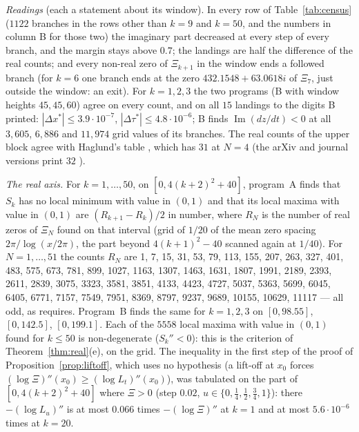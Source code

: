 \documentclass[11pt]{article}
\theoremstyle{plain}
\theoremstyle{definition}
\theoremstyle{remark}
\newcommand{\im}{\operatorname{Im}}
\begin{document}
\emph{Readings} (each a statement about its window). In every row of
Table~\ref{tab:census} ($1122$ branches in the rows other than $k = 9$ and
$k = 50$, and the numbers in column B for those two) the imaginary part decreased at every step of every branch,
and the margin stays above $0.7$; the landings are half the difference
of the real counts; and every non-real zero of $\Xi_{k+1}$ in the window ends a
followed branch (for $k = 6$ one branch ends at the zero $432.1548 + 63.0618i$
of $\Xi_7$, just outside the window: an exit). For $k = 1, 2, 3$ the two programs (B with window heights $45, 45, 60$)
agree on every count, and on all $15$ landings to the digits B printed:
$|\Delta x^*| \le 3.9\cdot10^{-7}$, $|\Delta\tau^*| \le 4.8\cdot10^{-6}$;
B finds $\im(dz/dt) < 0$ at all $3{,}605$, $6{,}886$ and $11{,}974$ grid values
of its branches. The real counts of the upper block agree with Haglund's table
\cite[p.~4]{HagW}, which has $31$ at $N = 4$ (the arXiv and journal versions
print $32$ \cite[p.~4]{Hag}).

\emph{The real axis.} For $k = 1, \ldots, 50$, on $[0, 4(k+2)^2 + 40]$, program~A
finds that $S_k$ has no local minimum with value in $(0,1)$ and that its local
maxima with value in $(0,1)$ are $(R_{k+1} - R_k)/2$ in number, where $R_N$ is
the number of real zeros of $\Xi_N$ found on that interval (grid of $1/20$ of
the mean zero spacing $2\pi/\log(x/2\pi)$, the part beyond $4(k+1)^2 - 40$
scanned again at $1/40$). For $N = 1, \ldots, 51$ the counts $R_N$ are
1, 7, 15, 31, 53, 79, 113, 155, 207, 263, 327, 401, 483, 575, 673, 781, 899,
1027, 1163, 1307, 1463, 1631, 1807, 1991, 2189, 2393, 2611, 2839, 3075, 3323,
3581, 3851, 4133, 4423, 4727, 5037, 5363, 5699, 6045, 6405, 6771, 7157, 7549,
7951, 8369, 8797, 9237, 9689, 10155, 10629, 11117 --- all odd, as
\cite[Corollary~3.5]{Tya} requires. Program~B finds the same for $k = 1, 2, 3$
on $[0, 98.55]$, $[0, 142.5]$, $[0, 199.1]$. Each of the $5558$ local maxima
with value in $(0,1)$ found for $k \le 50$ is non-degenerate ($S_k'' < 0$):
this is the criterion of Theorem~\ref{thm:real}(e), on the grid. The inequality in the first step of the proof of
Proposition~\ref{prop:liftoff}, which uses no hypothesis (a lift-off at $x_0$
forces $(\log\Xi)''(x_0) \ge (\log L_t)''(x_0)$), was tabulated on the part of
$[0, 4(k+2)^2 + 40]$ where $\Xi > 0$ (step $0.02$, $u \in \{0, \frac14,
\frac12, \frac34, 1\}$): there $-(\log L_u)''$ is at most $0.066$ times
$-(\log\Xi)''$ at $k = 1$ and at most $5.6\cdot10^{-6}$ times at $k = 20$.
\end{document}
